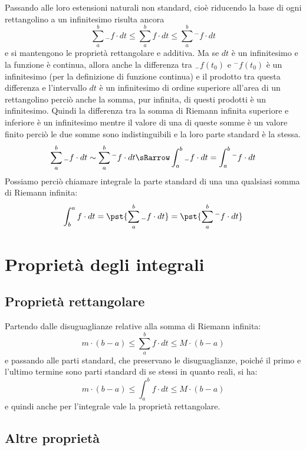   Passando alle loro estensioni naturali non standard, cioè riducendo la base 
di ogni rettangolino a un infinitesimo risulta ancora 
\[\sum_a^b {}_{-}f \cdot dt \le \sum_a^b f \cdot dt \le 
  \sum_a^b {}^{-}f \cdot dt\] 
e si mantengono le proprietà rettangolare e additiva. 
Ma se \(dt\) è un infinitesimo e la funzione è continua, allora anche la 
differenza tra \({}_{-}f(t_0)\) e \({}^{-}f(t_0)\) è un infinitesimo (per la 
definizione di funzione continua) e il prodotto tra questa differenza e 
l'intervallo \(dt\) è un infinitesimo di ordine superiore 
all'area di un rettangolino perciò anche la somma, 
pur infinita, di questi prodotti è un infinitesimo. 
Quindi la differenza tra la somma di Riemann infinita 
superiore e inferiore è un infinitesimo mentre il valore di una di queste 
somme è un valore finito perciò le due somme sono indistinguibili e la loro 
parte standard è la stessa.
\[\sum_a^b {}_{-}f \cdot dt \sim \sum_a^b {}^{-}f \cdot dt \sRarrow 
  \int_a^b {}_{-}f \cdot dt = \int_a^b {}^{-}f \cdot dt\]
Possiamo perciò chiamare integrale la parte standard di una una qualsiasi 
somma di Riemann infinita:
\[\int_b^a f \cdot dt = \pst{\sum_a^b {}_{-}f \cdot dt} =
                        \pst{\sum_a^b {}^{-}f \cdot dt}\]

\section{Proprietà degli integrali}
\label{sec:integrali_proprieta}

\subsection{Proprietà rettangolare}
\label{subsec:integrali_proprieta_rettangolare}

Partendo dalle disuguaglianze relative alla somma di Riemann infinita:
\[m \cdot (b - a) \le  \sum_a^b f \cdot dt  \le M\cdot(b - a)\]
e passando alle parti standard, che 
preservano le disuguaglianze, poiché il primo e l'ultimo termine sono parti 
standard di se stessi in quanto reali, si ha: 
\[m \cdot(b - a) \le  \int_a^b f \cdot dt  \le M\cdot(b - a)\] 
e quindi anche per l'integrale vale la proprietà rettangolare.

\subsection{Altre proprietà }
\label{subsec:integrali_altre_proprieta}

